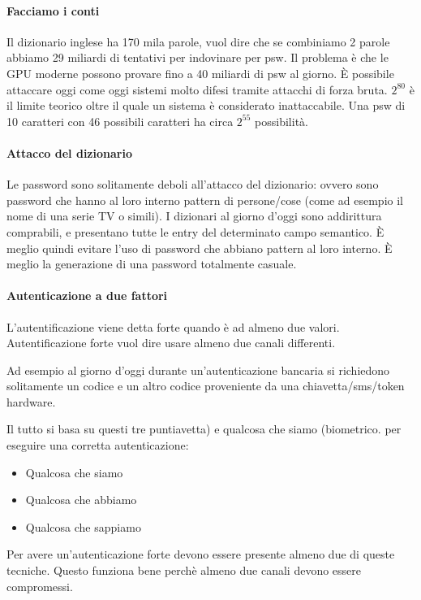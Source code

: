 \paragraph*{Facciamo i conti}

Il dizionario inglese ha 170 mila parole, vuol dire che se combiniamo 2 parole 
abbiamo 29 miliardi di tentativi per indovinare per psw. Il problema è che le 
GPU moderne possono provare fino a 40 miliardi di psw al giorno.
È possibile attaccare oggi come oggi sistemi molto difesi tramite attacchi di 
forza bruta.
$2^80$ è il limite teorico oltre il quale un sistema è considerato 
inattaccabile. Una psw di 10 caratteri con 46 possibili caratteri ha circa 
$2^55$ possibilità.

\paragraph*{Attacco del dizionario}
Le password sono solitamente deboli all'attacco del dizionario: ovvero sono 
password che hanno al loro interno pattern di persone/cose (come ad esempio il 
nome di una serie TV o simili). I dizionari al giorno d'oggi sono addirittura 
comprabili, e presentano tutte le entry del determinato campo semantico.
È meglio quindi evitare l'uso di password che abbiano pattern al loro interno. 
È meglio la generazione di una password totalmente casuale.

\paragraph{Autenticazione a due fattori}

L'autentificazione viene detta forte quando è ad almeno due valori. 
Autentificazione forte vuol dire usare almeno due canali differenti.

Ad esempio al giorno d'oggi durante un'autenticazione bancaria si richiedono 
solitamente un codice e un altro codice proveniente da una chiavetta/sms/token 
hardware.

Il tutto si basa su questi tre puntiavetta) e qualcosa che siamo (biometrico. 
per eseguire una corretta autenticazione:
\begin{itemize}
 \item Qualcosa che siamo
 \item Qualcosa che abbiamo
 \item Qualcosa che sappiamo
\end{itemize}

Per avere un'autenticazione forte devono essere presente almeno due di queste 
tecniche. Questo funziona bene perchè almeno due canali devono essere 
compromessi.

